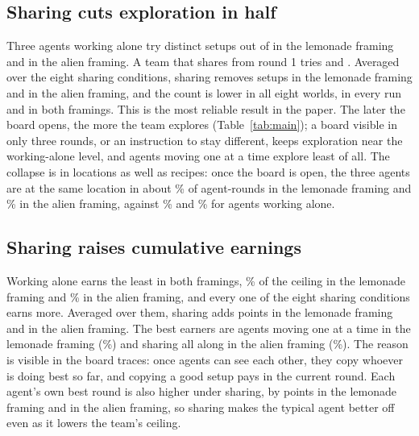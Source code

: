 \subsection{Sharing cuts exploration in half}
Three agents working alone try \LemSoloUniq{} distinct setups out of \NAttempts{} in the lemonade framing and
\AliSoloUniq{} in the alien framing. A team that shares from round 1 tries \LemShareUniq{} and
\AliShareUniq{}. Averaged over the eight sharing conditions, sharing removes \AllLemUniq{} setups in the lemonade
framing and \AllAliUniq{} in the alien framing, and the count is lower in all eight worlds, in every run and in
both framings. This is the most reliable result in the paper. The later the board opens, the more the team
explores (Table~\ref{tab:main}); a board visible in only three rounds, or an instruction to stay different,
keeps exploration near the working-alone level, and agents moving one at a time explore least of all. The
collapse is in locations as well as recipes: once the board is open, the three agents are at the same location
in about \SameLocShareLem\% of agent-rounds in the lemonade framing and \SameLocShareAli\% in the alien
framing, against \SameLocSoloLem\% and \SameLocSoloAli\% for agents working alone.

\subsection{Sharing raises cumulative earnings}
Working alone earns the least in both framings, \LemSoloSum\% of the ceiling in the lemonade framing and
\AliSoloSum\% in the alien framing, and every one of the eight sharing conditions earns more. Averaged over
them, sharing adds \AllLemSum{} points in the lemonade framing and \AllAliSum{} in the alien framing. The
best earners are agents moving one at a time in the lemonade framing (\LemStaggerSum\%) and sharing all along
in the alien framing (\AliShareSum\%). The reason is visible in the board traces: once agents can
see each other, they copy whoever is doing best so far, and copying a good setup pays in the current round. Each
agent's own best round is also higher under sharing, by \OwnBestLem{} points in the lemonade framing and
\OwnBestAli{} in the alien framing, so sharing makes the typical agent better off even as it lowers the
team's ceiling.


